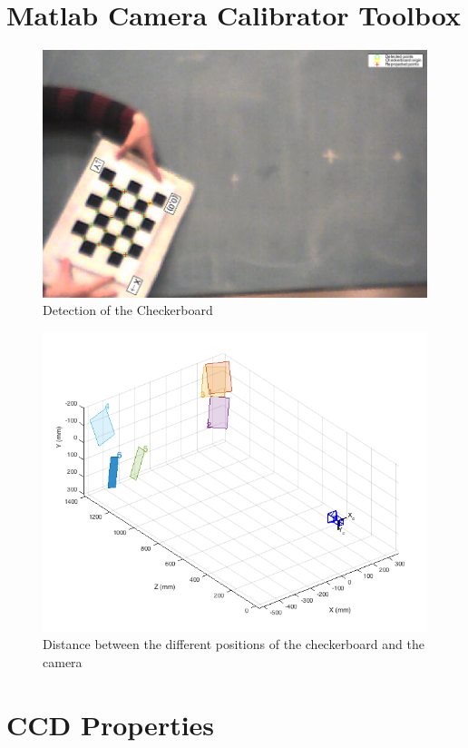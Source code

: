 \documentclass[12pt,a4paper,fleqn, onesside]{report}
\begin{document}
\section{Matlab Camera Calibrator Toolbox}
\label{Toolbox}
\begin{figure}[h]
  \centering
  \centerline{\includegraphics[scale=0.25]{fig/Checkboard.png}}
  \caption{Detection of the Checkerboard}
  \label{fig:checkerboard}
\end{figure}
\begin{figure}[h]
  \centering
  \centerline{\includegraphics[scale=0.45]{fig/Extrinsics.png}}
  \caption{Distance between the different positions of the checkerboard and the camera}
  \label{fig:extrinsics}
\end{figure}


\section{CCD Properties}
\label{CCDdatasheet}





\end{document}
